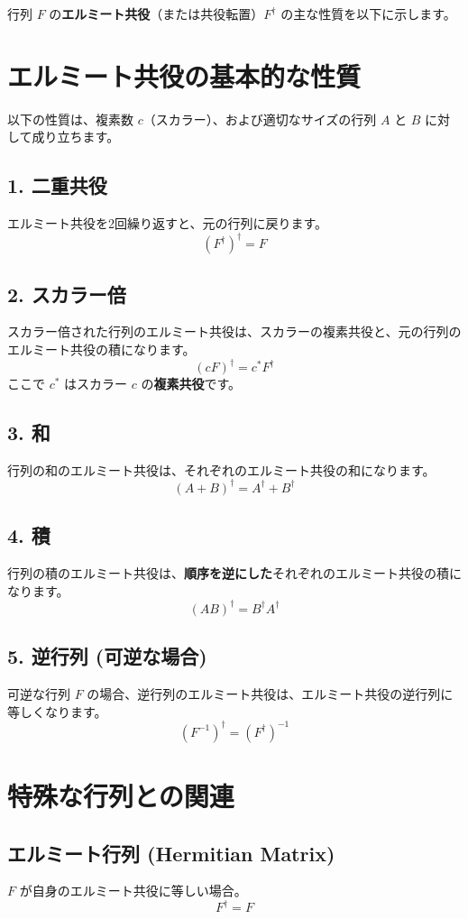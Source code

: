\documentclass{ltjsarticle}
\begin{document}
行列 $F$ の\textbf{エルミート共役}（または共役転置）$F^\dagger$ の主な性質を以下に示します。

\section*{エルミート共役の基本的な性質}

以下の性質は、複素数 $c$（スカラー）、および適切なサイズの行列 $A$ と $B$ に対して成り立ちます。

\subsection*{1. 二重共役}
エルミート共役を2回繰り返すと、元の行列に戻ります。
$$(F^\dagger)^\dagger = F$$

\subsection*{2. スカラー倍}
スカラー倍された行列のエルミート共役は、スカラーの複素共役と、元の行列のエルミート共役の積になります。
$$(c F)^\dagger = c^* F^\dagger$$
ここで $c^*$ はスカラー $c$ の\textbf{複素共役}です。

\subsection*{3. 和}
行列の和のエルミート共役は、それぞれのエルミート共役の和になります。
$$(A + B)^\dagger = A^\dagger + B^\dagger$$

\subsection*{4. 積}
行列の積のエルミート共役は、\textbf{順序を逆にした}それぞれのエルミート共役の積になります。
$$(A B)^\dagger = B^\dagger A^\dagger$$

\subsection*{5. 逆行列 (可逆な場合)}
可逆な行列 $F$ の場合、逆行列のエルミート共役は、エルミート共役の逆行列に等しくなります。
$$(F^{-1})^\dagger = (F^\dagger)^{-1}$$

\section*{特殊な行列との関連}

\subsection*{エルミート行列 (Hermitian Matrix)}
$F$ が自身のエルミート共役に等しい場合。
$$F^\dagger = F$$
\end{document}
